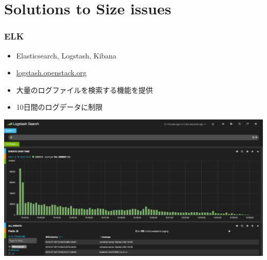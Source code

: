 \documentclass[aspectratio=169,11pt,hyperref={colorlinks=true}]{beamer}
\begin{document}
\section{Solutions to Size issues}
\begin{frame}
  \frametitle{ELK}
  \begin{itemize}
    \item Elasticsearch, Logstash, Kibana
    \item \href{http://logstash.openstack.org}{logstash.openstack.org}
    \item 大量のログファイルを検索する機能を提供
    \item 10日間のログデータに制限
  \end{itemize}
  \begin{center}
    \includegraphics[width=.75\textwidth]{kibana-sample.png}
  \end{center}
\end{frame}
\end{document}
